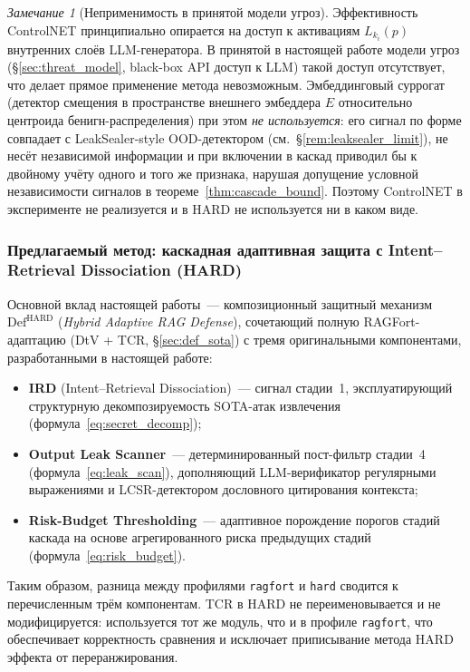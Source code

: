 \documentclass[12pt, a4paper]{article}
\theoremstyle{definition}
\theoremstyle{remark}
\newtheorem*{remark}{Замечание}
\begin{document}
\begin{remark}[Неприменимость в принятой модели угроз]
\label{rem:controlnet_limit}
Эффективность ControlNET принципиально опирается на доступ к активациям $L_{k_i}(p)$ внутренних слоёв LLM-генератора. В принятой в настоящей работе модели угроз (\S\ref{sec:threat_model}, black-box API доступ к LLM) такой доступ отсутствует, что делает прямое применение метода невозможным. Эмбеддинговый суррогат (детектор смещения в пространстве внешнего эмбеддера $E$ относительно центроида бенигн-распределения) при этом \textit{не используется}: его сигнал по форме совпадает с LeakSealer-style OOD-детектором (см.~\S\ref{rem:leaksealer_limit}), не несёт независимой информации и при включении в каскад приводил бы к двойному учёту одного и того же признака, нарушая допущение условной независимости сигналов в теореме~\ref{thm:cascade_bound}. Поэтому ControlNET в эксперименте не реализуется и в HARD не используется ни в каком виде.
\end{remark}

\subsubsection{Предлагаемый метод: каскадная адаптивная защита с Intent--Retrieval Dissociation (HARD)}
\label{sec:def_hard}

Основной вклад настоящей работы~--- композиционный защитный механизм $\mathrm{Def}^{\text{HARD}}$ (\textit{Hybrid Adaptive RAG Defense}), сочетающий полную RAGFort-адаптацию (DtV + TCR, \S\ref{sec:def_sota}) с тремя оригинальными компонентами, разработанными в настоящей работе:
\begin{itemize}[label=$\bullet$]
    \item \textbf{IRD} (Intent--Retrieval Dissociation)~--- сигнал стадии~1, эксплуатирующий структурную декомпозируемость SOTA-атак извлечения (формула~\eqref{eq:secret_decomp});
    \item \textbf{Output Leak Scanner}~--- детерминированный пост-фильтр стадии~4 (формула~\eqref{eq:leak_scan}), дополняющий LLM-верификатор регулярными выражениями и LCSR-детектором дословного цитирования контекста;
    \item \textbf{Risk-Budget Thresholding}~--- адаптивное порождение порогов стадий каскада на основе агрегированного риска предыдущих стадий (формула~\eqref{eq:risk_budget}).
\end{itemize}
Таким образом, разница между профилями \texttt{ragfort} и \texttt{hard} сводится к перечисленным трём компонентам. TCR в HARD не переименовывается и не модифицируется: используется тот же модуль, что и в профиле \texttt{ragfort}, что обеспечивает корректность сравнения и исключает приписывание метода HARD эффекта от переранжирования.
\end{document}
